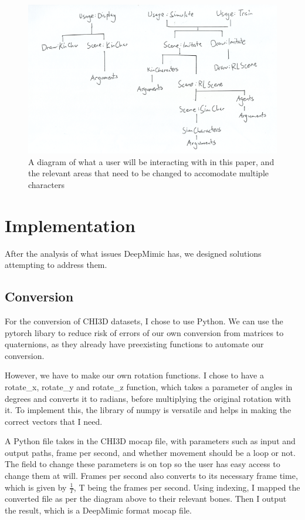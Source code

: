 \documentclass{l4proj}
\begin{document}
\begin{figure}[htb]
  \centering
  \includegraphics[width=1.0\linewidth]{images/class_structure.png}
  \caption{A diagram of what a user will be interacting with in this paper, and the relevant areas that need to be changed to accomodate multiple characters}
  \label{fig:classdiagram}
\end{figure}

\chapter{Implementation}
After the analysis of what issues DeepMimic has, we designed solutions attempting to address them.

\section{Conversion}
For the conversion of CHI3D datasets, I chose to use Python. We can use the pytorch libary to reduce risk of errors of our own conversion from matrices to quaternions, as they already have preexisting functions to automate our conversion.

However, we have to make our own rotation functions. I chose to have a rotate\_x, rotate\_y and rotate\_z function, which takes a parameter of angles in degrees and converts it to radians, before multiplying the original rotation with it. To implement this, the library of numpy is versatile and helps in making the correct vectors that I need.

A Python file takes in the CHI3D mocap file, with parameters such as input and output paths, frame per second, and whether movement should be a loop or not. The field to change these parameters is on top so the user has easy access to change them at will. Frames per second also converts to its necessary frame time, which is given by $\frac{1}{T}$, T being the frames per second. Using indexing, I mapped the converted file as per the diagram above to their relevant bones. Then I output the result, which is a DeepMimic format mocap file.
\end{document}
